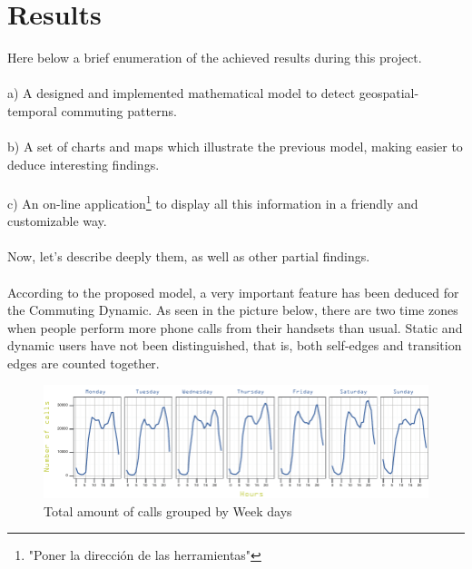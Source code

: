 \newpage
\section{Results}

Here below a brief enumeration of the achieved results during this project.
\\
\\
a) A designed and implemented mathematical model to detect geospatial-temporal commuting patterns.
\\
\\
b) A set of charts and maps which illustrate the previous model, making easier to deduce interesting findings.
\\
\\
c) An on-line application\footnote{"Poner la dirección de las herramientas"} to display all this information in a friendly and customizable way.
\\
\\
Now, let's describe deeply them, as well as other partial findings.
\\
\\
According to the proposed model, a very important feature has been deduced for the Commuting Dynamic. As seen in the picture below, there are two time zones when people perform more phone calls from their handsets than usual. Static and dynamic users have not been distinguished, that is, both self-edges and transition edges are counted together.

\begin{figure}[h]
\begin{center}
\includegraphics[scale =1.1] {results/images/calls_number.pdf}
\caption{Total amount of calls grouped by Week days}
\label{fig:count_calls}
\end{center}
\end{figure}


